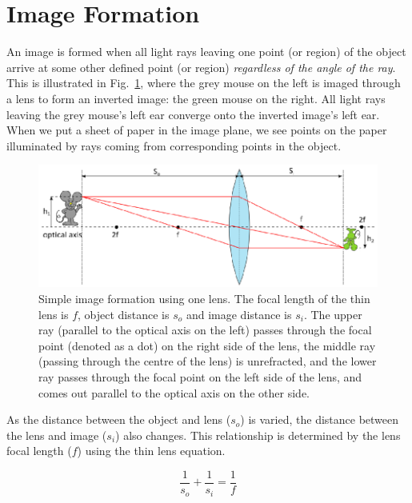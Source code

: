 \documentclass[a4paper]{report}
\begin{document}
\clearpage

\section{Image Formation}
An image is formed when all light rays leaving one point (or region) of the object arrive at some other defined point (or region) \textit{regardless of the angle of the ray}. 
This is illustrated in Fig.~\ref{fig:imageforming}, where the grey mouse on the left is imaged through a lens to form an inverted image: the green mouse on the right. 
All light rays leaving the grey mouse's left ear converge onto the inverted image's left ear. 
When we put a sheet of paper in the image plane, we see points on the paper illuminated by rays coming from corresponding points in the object. 



\begin{figure}[h]
\center
\includegraphics{image_forming_basics.eps}
\caption{Simple image formation using one lens. 
The focal length of the thin lens is $f$, object distance is $s_o$ and image distance is $s_i$. 
The upper ray (parallel to the optical axis on the left) passes through the focal point (denoted as a dot) on the right side of the lens, the middle ray (passing through the centre of the lens) is unrefracted, and the lower ray passes through the focal point on the left side of the lens, and comes out parallel to the optical axis on the other side. 
}
\label{fig:imageforming}
\end{figure}

As the distance between the object and lens ($s_o$) is varied, the distance between the lens and image ($s_i$) also changes. This relationship is determined by the lens focal length ($f$) using the thin lens equation.

\begin{equation}
\frac{1}{s_o} + \frac{1}{s_i} = \frac{1}{f}
\label{eq:thinlens}
\end{equation}
\end{document}
